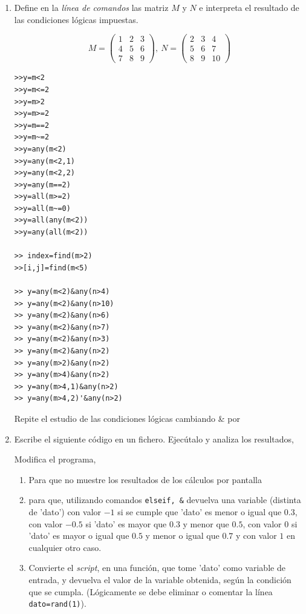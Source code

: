 \begin{enumerate}
\item Define en la \emph{línea de comandos} las matriz $M$ y $N$ e interpreta el resultado de las condiciones lógicas impuestas.

\begin{equation*}
M =\begin{pmatrix}
1&2&3\\
4&5&6\\
7&8&9
\end{pmatrix}, \ N=\begin{pmatrix}
2&3&4\\
5&6&7\\
8&9&10
\end{pmatrix}
\end{equation*}
\begin{verbatim}
>>y=m<2
>>y=m<=2
>>y=m>2
>>y=m>=2
>>y=m==2
>>y=m~=2
>>y=any(m<2)
>>y=any(m<2,1)
>>y=any(m<2,2)
>>y=any(m==2)
>>y=all(m>=2)
>>y=all(m~=0)
>>y=all(any(m<2))
>>y=any(all(m<2))

>> index=find(m>2)
>>[i,j]=find(m<5)

>> y=any(m<2)&any(n>4)
>> y=any(m<2)&any(n>10)
>> y=any(m<2)&any(n>6)
>> y=any(m<2)&any(n>7)
>> y=any(m<2)&any(n>3)
>> y=any(m<2)&any(n>2)
>> y=any(m>2)&any(n>2)
>> y=any(m>4)&any(n>2)
>> y=any(m>4,1)&any(n>2)
>> y=any(m>4,2)'&any(n>2)
\end{verbatim}
Repite el estudio de las condiciones lógicas cambiando \& por \textbar

\item Escribe el siguiente código en un fichero. Ejecútalo y analiza los resultados,

Modifica el programa,
\begin{enumerate}
\item Para que no muestre los resultados de los cálculos por pantalla
\item para que, utilizando comandos \verb|elseif, &| devuelva una variable (distinta de 'dato') con valor $-1$ si se cumple que 'dato' es menor o igual que $0.3$, con valor $-0.5$ si 'dato' es mayor que $0.3$ y menor que $0.5$, con valor $0$ si 'dato' es mayor o igual que $0.5$ y menor  o igual que $0.7$ y con valor $1$ en cualquier otro caso.
\item Convierte el \emph{script}, en una función, que tome 'dato' como variable de entrada, y devuelva el valor de la variable obtenida, según la condición que se cumpla. (Lógicamente se debe eliminar o comentar la línea \verb|dato=rand(1)|).
\end{enumerate}


\end{enumerate}
